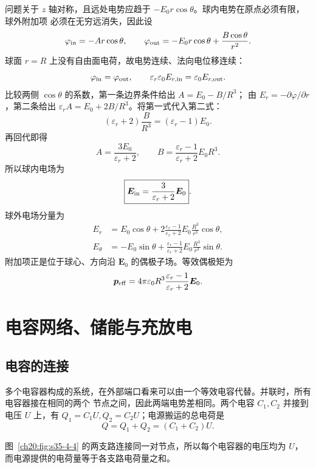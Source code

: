 {\begin{xesolution}
问题关于 $z$ 轴对称，且远处电势应趋于 $-E_0r\cos\theta$。球内电势在原点必须有限，球外附加项
必须在无穷远消失，因此设
\[
 \varphi_{\rm in}=-Ar\cos\theta,
 \qquad
 \varphi_{\rm out}=-E_0r\cos\theta+\frac{B\cos\theta}{r^2}.
\]
球面 $r=R$ 上没有自由面电荷，故电势连续、法向电位移连续：
\[
 \varphi_{\rm in}=\varphi_{\rm out},\qquad
 \varepsilon_r\varepsilon_0E_{r,\rm in}=\varepsilon_0E_{r,\rm out}.
\]
比较两侧 $\cos\theta$ 的系数，第一条边界条件给出 $A=E_0-B/R^3$；
由 $E_r=-\partial\varphi/\partial r$，第二条给出
$\varepsilon_r A=E_0+2B/R^3$。将第一式代入第二式：
\[
 (\varepsilon_r+2)\frac B{R^3}=(\varepsilon_r-1)E_0.
\]
再回代即得
\[
 A=\frac{3E_0}{\varepsilon_r+2},\qquad
 B=\frac{\varepsilon_r-1}{\varepsilon_r+2}E_0R^3.
\]
所以球内电场为
\[
 \boxed{\boldsymbol E_{\rm in}=\frac{3}{\varepsilon_r+2}\boldsymbol E_0}.
\]
球外电场分量为
\[
 \boxed{\begin{aligned}
 E_r&=E_0\cos\theta+
 2\frac{\varepsilon_r-1}{\varepsilon_r+2}E_0\frac{R^3}{r^3}\cos\theta,\\
 E_\theta&=-E_0\sin\theta+
 \frac{\varepsilon_r-1}{\varepsilon_r+2}E_0\frac{R^3}{r^3}\sin\theta.
 \end{aligned}}
\]
附加项正是位于球心、方向沿 $\boldsymbol E_0$ 的偶极子场。等效偶极矩为
\[
 \boldsymbol p_{\rm eff}=4\pi\varepsilon_0R^3
 \frac{\varepsilon_r-1}{\varepsilon_r+2}\boldsymbol E_0.
\]
\end{xesolution}



\section{电容网络、储能与充放电}

\subsection{电容的连接}


多个电容器构成的系统，在外部端口看来可以由一个等效电容代替。并联时，所有电容器接在相同的两个
节点之间，因此两端电势差相同。两个电容 $C_1,C_2$ 并接到电压 $U$ 上，有
$Q_1=C_1U,Q_2=C_2U$；电源搬运的总电荷是
\[
  Q=Q_1+Q_2=(C_1+C_2)U.
\]

图~\ref{ch20:fig:s35-4-4} 的两支路连接同一对节点，所以每个电容器的电压均为 $U$，而电源提供的电荷量等于各支路电荷量之和。

\par\noindent\begin{minipage}{\linewidth}
\capacitorParallelFigure
{}\label{ch20:fig:s35-4-4}
\end{minipage}\par\medskip

}
